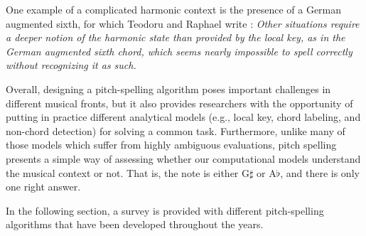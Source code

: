 One example of a complicated harmonic context is the
presence of a German augmented sixth, for which Teodoru
and Raphael write \parencite{teodoru2007pitch}:
\emph{Other situations require a deeper notion of the
harmonic state than provided by the local key, as in the
German augmented sixth chord, which seems nearly
impossible to spell correctly without recognizing it as
such.}

Overall, designing a pitch-spelling algorithm poses
important challenges in different musical fronts, but it
also provides researchers with the opportunity of putting
in practice different analytical models (e.g., local key,
chord labeling, and non-chord detection) for solving a
common task. Furthermore, unlike many of those models
which suffer from highly ambiguous evaluations, pitch
spelling presents a simple way of assessing whether our
computational models understand the musical context or
not. That is, the note is either G$\sharp$ or A$\flat$,
and there is only one right answer.

In the following section, a survey is provided with
different pitch-spelling algorithms that have been
developed throughout the years.
